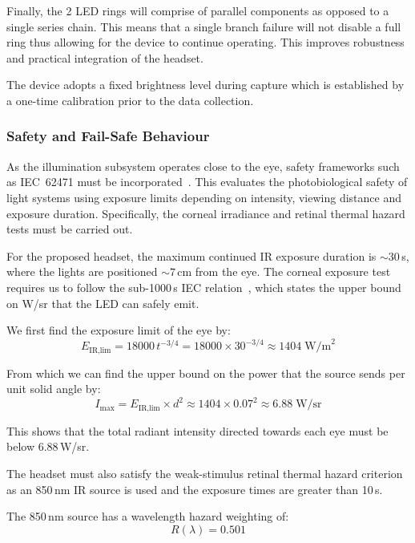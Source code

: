 Finally, the 2 LED rings will comprise of parallel components as opposed to a single series chain. This means that a single branch failure will not disable a full ring thus allowing for the device to continue operating. This improves robustness and practical integration of the headset.

The device adopts a fixed brightness level during capture which is established by a one-time calibration prior to the data collection.

\subsubsection{Safety and Fail-Safe Behaviour}

As the illumination subsystem operates close to the eye, safety frameworks such as IEC~62471 must be incorporated~\cite{iec62471}. This evaluates the photobiological safety of light systems using exposure limits depending on intensity, viewing distance and exposure duration. Specifically, the corneal irradiance and retinal thermal hazard tests must be carried out.

For the proposed headset, the maximum continued IR exposure duration is ${\sim}30$\,s, where the lights are positioned ${\sim}7$\,cm from the eye. The corneal exposure test requires us to follow the sub-1000\,s IEC relation~\cite{osram2017iec62471}, which states the upper bound on W/sr that the LED can safely emit.

We first find the exposure limit of the eye by:
%
\begin{equation}
    E_{\text{IR,lim}} = 18000 \, t^{-3/4} = 18000 \times 30^{-3/4} \approx 1404 \; \text{W/m}^{2}
\end{equation}

From which we can find the upper bound on the power that the source sends per unit solid angle by:
%
\begin{equation}
    I_{\max} = E_{\text{IR,lim}} \times d^{2} \approx 1404 \times 0.07^{2} \approx 6.88 \; \text{W/sr}
\end{equation}

This shows that the total radiant intensity directed towards each eye must be below 6.88\,W/sr.

The headset must also satisfy the weak-stimulus retinal thermal hazard criterion as an 850\,nm IR source is used and the exposure times are greater than 10\,s.

The 850\,nm source has a wavelength hazard weighting of:
%
\begin{equation}
    R(\lambda) = 0.501
\end{equation}

